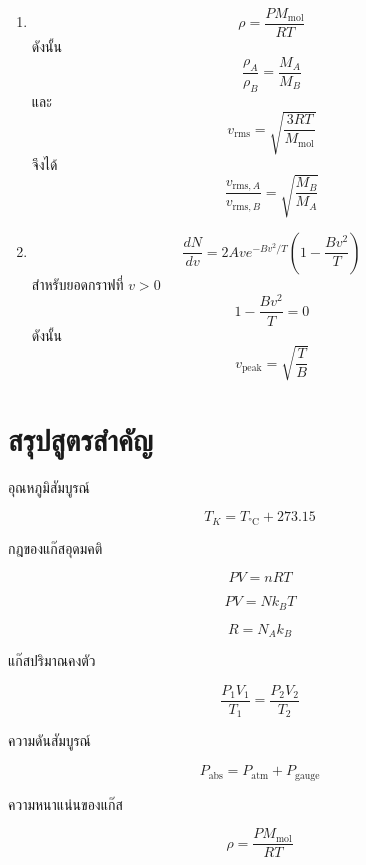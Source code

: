 \begin{enumerate}
    \item
    \[
    \rho
    =
    \frac{PM_{\text{mol}}}{RT}
    \]
    ดังนั้น
    \[
    \boxed{
    \frac{\rho_A}{\rho_B}
    =
    \frac{M_A}{M_B}
    }
    \]
    และ
    \[
    v_{\text{rms}}
    =
    \sqrt{\frac{3RT}{M_{\text{mol}}}}
    \]
    จึงได้
    \[
    \boxed{
    \frac{v_{\text{rms},A}}
    {v_{\text{rms},B}}
    =
    \sqrt{\frac{M_B}{M_A}}
    }
    \]

    \item
    \[
    \frac{dN}{dv}
    =
    2Ave^{-Bv^2/T}
    \left(1-\frac{Bv^2}{T}\right)
    \]
    สำหรับยอดกราฟที่ $v>0$
    \[
    1-\frac{Bv^2}{T}=0
    \]
    ดังนั้น
    \[
    \boxed{
    v_{\text{peak}}
    =
    \sqrt{\frac{T}{B}}
    }
    \]
\end{enumerate}

\section{สรุปสูตรสำคัญ}

\begin{tcolorbox}[title=สรุปบท: แก๊สอุดมคติ]
อุณหภูมิสัมบูรณ์

\[
T_{\si{K}}=T_{\si{\degreeCelsius}}+273.15
\]

กฎของแก๊สอุดมคติ

\[
PV=nRT
\]

\[
PV=Nk_BT
\]

\[
R=N_Ak_B
\]

แก๊สปริมาณคงตัว

\[
\frac{P_1V_1}{T_1}
=
\frac{P_2V_2}{T_2}
\]

ความดันสัมบูรณ์

\[
P_{\text{abs}}
=
P_{\text{atm}}+P_{\text{gauge}}
\]

ความหนาแน่นของแก๊ส

\[
\rho
=
\frac{PM_{\text{mol}}}{RT}
\]
\end{tcolorbox}


